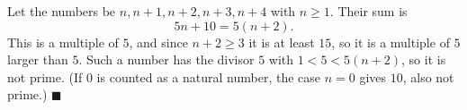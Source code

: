 Let the numbers be $n,n+1,n+2,n+3,n+4$ with $n\ge1$. Their sum is
\[5n+10=5(n+2).\]
This is a multiple of $5$, and since $n+2\ge3$ it is at least $15$, so it is a multiple of $5$ larger than $5$. Such a number has the divisor $5$ with $1<5<5(n+2)$, so it is not prime. (If $0$ is counted as a natural number, the case $n=0$ gives $10$, also not prime.) $\blacksquare$
